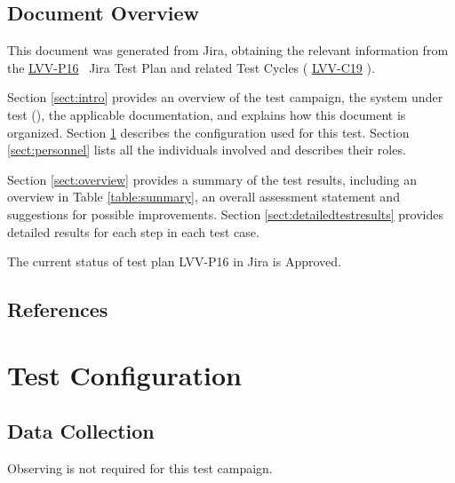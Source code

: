 \documentclass[DM,STR,toc]{lsstdoc}
\begin{document}
\subsection{Document Overview}
\label{sect:docoverview}

This document was generated from Jira, obtaining the relevant information from the 
\href{https://jira.lsstcorp.org/secure/Tests.jspa#/testPlan/LVV-P16}{LVV-P16}
~Jira Test Plan and related Test Cycles (
  \href{https://jira.lsstcorp.org/secure/Tests.jspa#/testCycle/LVV-C19}{LVV-C19}
).


Section \ref{sect:intro} provides an overview of the test campaign, the system under test (\product{}), the applicable documentation, and explains how this document is organized.
Section \ref{sect:configuration}  describes the configuration used for this test.
Section \ref{sect:personnel} lists all the individuals involved and describes their roles.

Section \ref{sect:overview} provides a summary of the test results, including an overview in Table \ref{table:summary}, an overall assessment statement and suggestions for possible improvements.
Section \ref{sect:detailedtestresults} provides detailed results for each step in each test case.

The current status of test plan LVV-P16 in Jira is Approved.

\subsection{References}
\label{sect:references}
\renewcommand{\refname}{}

\section{Test Configuration}
\label{sect:configuration}

\subsection{Data Collection}

  Observing is not required for this test campaign.
\end{document}
